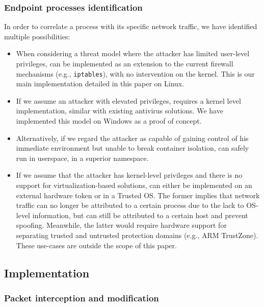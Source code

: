 \subsubsection{Endpoint processes identification}
\label{appfw:daf:arch-endpoint}

In order to correlate a process with its specific network traffic, we have identified multiple possibilities:
\begin{itemize}
    \item When considering a threat model where the attacker has limited user-level privileges, \daf{} can be implemented as an extension to the current firewall mechanisms (e.g., \texttt{iptables}), with no intervention on the kernel. This is our main implementation detailed in this paper on Linux.
    \item If we assume an attacker with elevated privileges, \daf{} requires a kernel level implementation, similar with existing antivirus solutions. We have implemented this model on Windows as a proof of concept.
    \item Alternatively, if we regard the attacker as capable of gaining control of his immediate environment but unable to break container isolation, \daf{} can safely run in userspace, in a superior namespace.
    \item If we assume that the attacker has kernel-level privileges and there is no support for virtualization-based solutions, \daf{} can either be implemented on an external hardware token or in a Trusted OS. The former implies that network traffic can no longer be attributed to a certain process due to the lack to OS-level information, but can still be attributed to a certain host and prevent spoofing. Meanwhile, the latter would require hardware support for separating trusted and untrusted protection domains (e.g., ARM TrustZone). These use-cases are outside the scope of this paper.
\end{itemize}

\subsection{Implementation}
\label{appfw:daf:implementation}

\subsubsection{Packet interception and modification}

